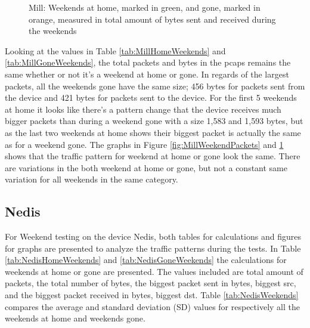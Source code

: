 \begin{figure}[H]
    \begin{subfigure}[b]{0.47\textwidth}
    \end{subfigure}
    \begin{subfigure}[b]{0.47\textwidth}
    \end{subfigure}
   \begin{subfigure}[b]{0.47\textwidth}
    \end{subfigure}
    \hspace{0.6cm}
    \begin{subfigure}[b]{0.47\textwidth}
    \end{subfigure}
    \caption{Mill: Weekends at home, marked in green, and gone, marked in orange, measured in total amount of bytes sent and received during the weekends}    \label{fig:MillWeekendBytes}
\end{figure}

Looking at the values in Table \ref{tab:MillHomeWeekends} and \ref{tab:MillGoneWeekends}, the total packets and bytes in the pcaps remains the same whether or not it's a weekend at home or gone. In regards of the largest packets, all the weekends gone have the same size; 456 bytes for packets sent from the device and 421 bytes for packets sent to the device. For the first 5 weekends at home it looks like there's a pattern change that the device receives much bigger packets than during a weekend gone with a size 1,583 and 1,593 bytes, but as the last two weekends at home shows their biggest packet is actually the same as for a weekend gone. The graphs in Figure \ref{fig:MillWeekendPackets} and \ref{fig:MillWeekendBytes} shows that the traffic pattern for weekend at home or gone look the same. There are variations in the both weekend at home or gone, but not a constant same variation for all weekends in the same category. 

\newpage
\subsection{Nedis}
For Weekend testing on the device Nedis, both tables for calculations and figures for graphs are presented to analyze the traffic patterns during the tests. In Table \ref{tab:NedisHomeWeekends} and \ref{tab:NedisGoneWeekends} the calculations for weekends at home or gone are presented. The values included are total amount of packets, the total number of bytes, the biggest packet sent in bytes, biggest src, and the biggest packet received in bytes, biggest dst. Table \ref{tab:NedisWeekends} compares the average and standard deviation (SD) values for respectively all the weekends at home and weekends gone.

